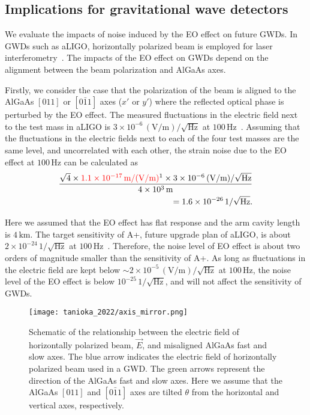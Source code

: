 \subsection{Implications for gravitational wave detectors}

We evaluate the impacts of noise induced by the EO effect on future GWDs.
In GWDs such as aLIGO, horizontally polarized beam is employed for laser interferometry~\cite{aasi:2015}.
The impacts of the EO effect on GWDs depend on the alignment between the beam polarization and AlGaAs axes.

Firstly, we consider the case that the polarization of the beam is aligned to the AlGaAs $[011]$ or $[0\bar{1}1]$ axes ($x'$ or $y'$) where the reflected optical phase is perturbed by the EO effect.
The measured fluctuations in the electric field next to the test mass in aLIGO is $3\times10^{-6}\, \mathrm{(V/m)/\sqrt{Hz}}$ at $100\, \mathrm{Hz}$~\cite{buikema:2020}.
Assuming that the fluctuations in the electric fields next to each of the four test masses are the same level, and uncorrelated with each other, the strain noise due to the EO effect at $100\, \mathrm{Hz}$ can be calculated as
\begin{align}
    \frac{\sqrt{4}\times \textcolor{red}{1.1\times10^{-17}\, \mathrm{m/(V/m)}}\footnotemark\times3\times10^{-6}\, \mathrm{(V/m)/\sqrt{Hz}}}{4\times10^3\, \mathrm{m}} \notag \\
    = 1.6\times10^{-26}\, \mathrm{1/\sqrt{Hz}}.
\end{align}


Here we assumed that the EO effect has flat response and the arm cavity length is $4\, \mathrm{km}$.
The target sensitivity of A+, future upgrade plan of aLIGO, is about $2\times10^{-24}\, \mathrm{1/{\sqrt{Hz}}}$ at $100\, \mathrm{Hz}$~\cite{Barsotti2018a+}.
Therefore, the noise level of EO effect is about two orders of magnitude smaller than the sensitivity of A+.
As long as fluctuations in the electric field are kept below $\sim2\times10^{-5}\, \mathrm{(V/m)/\sqrt{Hz}}$ at $100\, \mathrm{Hz}$, the noise level of the EO effect is below $10^{-25}\, \mathrm{1/\sqrt{Hz}}$, and will not affect the sensitivity of GWDs.


\begin{figure}[htbp]
    \centering
\texttt{[image: tanioka\_2022/axis\_mirror.png]}
\caption{
Schematic of the relationship between the electric field of horizontally polarized beam, $\vec{E}$, and misaligned AlGaAs fast and slow axes.
The blue arrow indicates the electric field of horizontally polarized beam used in a GWD.
The green arrows represent the direction of the AlGaAs fast and slow axes.
Here we assume that the AlGaAs $[011]$ and $[0\bar{1}1]$ axes are tilted $\theta$ from the horizontal and vertical axes, respectively.
}
\label{fig.tilt}
\end{figure}

